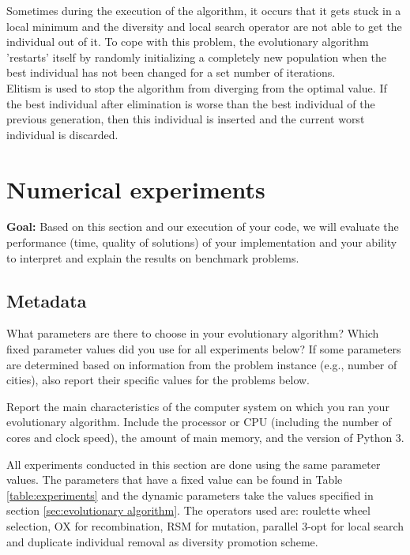 \documentclass[a4paper,10pt]{article}
\newcommand{\ReplaceMe}[1]{{\color{blue}#1}}
\newcommand{\RemoveMe}[1]{{\color{purple}#1}}
\begin{document}
Sometimes during the execution of the algorithm, it occurs that it gets stuck in a local minimum and the diversity and local search operator are not able to get the individual out of it. To cope with this problem, the evolutionary algorithm 'restarts' itself by randomly initializing a completely new population when the best individual has not been changed for a set number of iterations. \\

Elitism is used to stop the algorithm from diverging from the optimal value. If the best individual after elimination is worse than the best individual of the previous generation, then this individual is inserted and the current worst individual is discarded. 


\section{Numerical experiments}

\RemoveMe{\textbf{Goal:} Based on this section and our execution of your code, we will evaluate the performance (time, quality of solutions) of your implementation and your ability to interpret and explain the results on benchmark problems.}

\subsection{Metadata}

\ReplaceMe{What parameters are there to choose in your evolutionary algorithm? Which fixed parameter values did you use for all experiments below? If some parameters are determined based on information from the problem instance (e.g., number of cities), also report their specific values for the problems below.

Report the main characteristics of the computer system on which you ran your evolutionary algorithm. Include the processor or CPU (including the number of cores and clock speed), the amount of main memory, and the version of Python 3.}

All experiments conducted in this section are done using the same parameter values. The parameters that have a fixed value can be found in Table \ref{table:experiments} and the dynamic parameters take the values specified in section \ref{sec:evolutionary algorithm}. The operators used are: roulette wheel selection, OX for recombination, RSM for mutation, parallel 3-opt for local search and duplicate individual removal as diversity promotion scheme.\\
\end{document}
